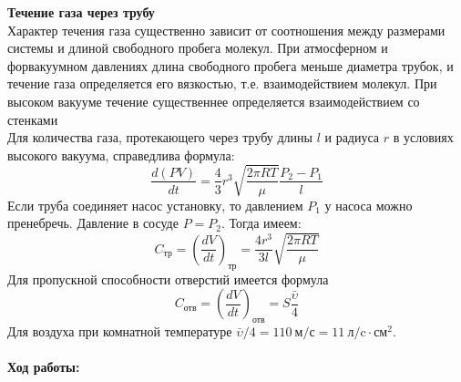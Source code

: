 \documentclass[a4paper, 12pt]{article}
\newcommand{\parag}[1]{\paragraph*{#1:}}
\begin{document}
\textbf{Течение газа через трубу}\\
Характер течения газа существенно зависит от соотношения между размерами системы и длиной свободного пробега молекул. При атмосферном и форвакуумном давлениях  длина свободного пробега меньше диаметра трубок, и течение газа определяется его вязкостью, т.е. взаимодействием молекул. При высоком вакууме течение существеннее определяется взаимодействием со стенками \\
Для количества газа, протекающего через трубу длины $l$ и радиуса $r$ в условиях высокого вакуума, справедлива формула:
\begin{equation}
	\frac{d(PV)}{dt} = \frac{4}{3}r^3\sqrt{\frac{2\pi RT}{\mu}}\frac{P_2 - P_1}{l}
\end{equation}
Если труба соединяет насос установку, то давлением $P_1$ у насоса можно пренебречь. Давление в сосуде $P = P_2$. Тогда имеем:
\begin{equation}
C_\text{тр} = \left(\frac{dV}{dt}\right)_\text{тр} = \frac{4r^3}{3l}\sqrt{\frac{2\pi RT}{\mu}}
\end{equation}
Для пропускной способности отверстий имеется формула
\begin{equation}
C_\text{отв} = \left(\frac{dV}{dt}\right)_\text{отв} = S\frac{\bar{\upsilon}}{4}
\end{equation}
Для воздуха при комнатной температуре $\bar{\upsilon}/4 = 110~\text{м/с} = 11~\text{л/c}\cdot\text{см}^2$.

\parag {Ход работы} ~\\
\end{document}
